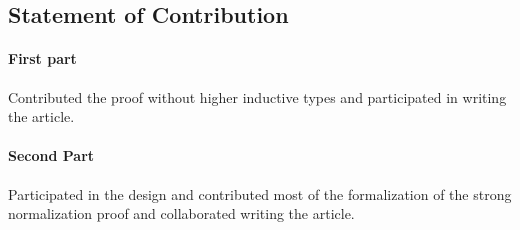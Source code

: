 \documentclass{book}
\begin{document}





\subsection{Statement of Contribution}
\paragraph{First part}
Contributed the proof without higher inductive types and participated
in writing the article.

\paragraph{Second Part}
Participated in the design and contributed most of the formalization
of the strong normalization proof and collaborated writing the
article.
\end{document}
